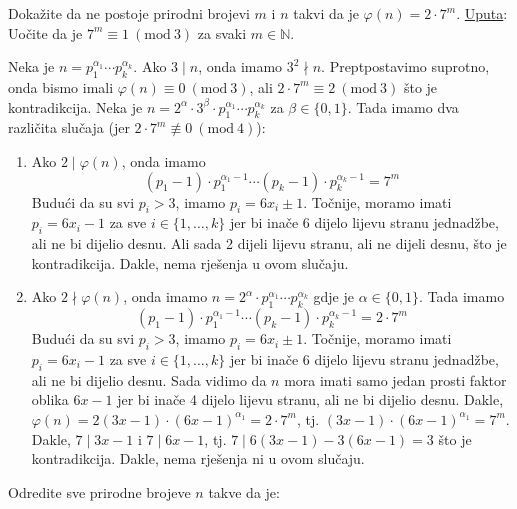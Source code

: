\documentclass{exam}
\newcommand{\Mod}[1]{\ (\mathrm{mod}\ #1)}
\begin{document}
\begin{questions}
\question Dokažite da ne postoje prirodni brojevi $m$ i $n$ takvi da je $\varphi(n) = 2 \cdot 7^m$. \newline
\underline{Uputa}: Uočite da je $7^m \equiv 1 \Mod{3}$ za svaki $m \in \mathbb{N}$.

\begin{solution}
  Neka je $n = p_1^{\alpha_1} \cdots p_k^{\alpha_k}$. Ako $3 \mid n$, onda imamo $3^2 \nmid n$. Preptpostavimo suprotno, onda bismo imali $\varphi(n) \equiv 0 \Mod{3}$, ali $2 \cdot 7^m \equiv 2\Mod{3}$ što je kontradikcija. Neka je $n = 2^{\alpha} \cdot 3^{\beta} \cdot p_1^{\alpha_1} \cdots p_k^{\alpha_k}$ za $\beta \in \{0, 1\}$. Tada imamo dva različita slučaja (jer $2 \cdot 7^m \not\equiv 0 \Mod{4}$):

  \pagebreak

  \begin{enumerate}
    \item Ako $2 \mid \varphi(n)$, onda imamo
      \[
        (p_1 - 1) \cdot p_1^{\alpha_1 - 1} \cdots (p_k - 1) \cdot p_k^{\alpha_k - 1} = 7^m
      \]
      Budući da su svi $p_i > 3$, imamo $p_i = 6x_i \pm 1$. Točnije, moramo imati $p_i = 6x_i - 1$ za sve $i \in \{1, \dots, k\}$ jer bi inače 6 dijelo lijevu stranu jednadžbe, ali ne bi dijelio desnu. Ali sada 2 dijeli lijevu stranu, ali ne dijeli desnu, što je kontradikcija. Dakle, nema rješenja u ovom slučaju.
    \item Ako $2 \nmid \varphi(n)$, onda imamo $n = 2^{\alpha} \cdot p_1^{\alpha_1} \cdots p_k^{\alpha_k}$ gdje je $\alpha \in \{0, 1\}$. Tada imamo
      \[
        (p_1 - 1) \cdot p_1^{\alpha_1 - 1} \cdots (p_k - 1) \cdot p_k^{\alpha_k - 1} = 2 \cdot7^m
      \]
      Budući da su svi $p_i > 3$, imamo $p_i = 6x_i \pm 1$. Točnije, moramo imati $p_i = 6x_i - 1$ za sve $i \in \{1, \dots, k\}$ jer bi inače 6 dijelo lijevu stranu jednadžbe, ali ne bi dijelio desnu. Sada vidimo da $n$ mora imati samo jedan prosti faktor oblika $6x - 1$ jer bi inače 4 dijelo lijevu stranu, ali ne bi dijelio desnu. Dakle, $\varphi(n) = 2(3x - 1) \cdot (6x - 1)^{\alpha_1} = 2 \cdot 7^m$, tj. $(3x - 1) \cdot (6x - 1)^{\alpha_1} = 7^m$. Dakle, $7 \mid 3x - 1$ i $7 \mid 6x - 1$, tj. $7 \mid 6(3x - 1) - 3(6x - 1) = 3$ što je kontradikcija. Dakle, nema rješenja ni u ovom slučaju.
  \end{enumerate}
\end{solution}

\question Odredite sve prirodne brojeve $n$ takve da je:
\end{questions}
\end{document}
